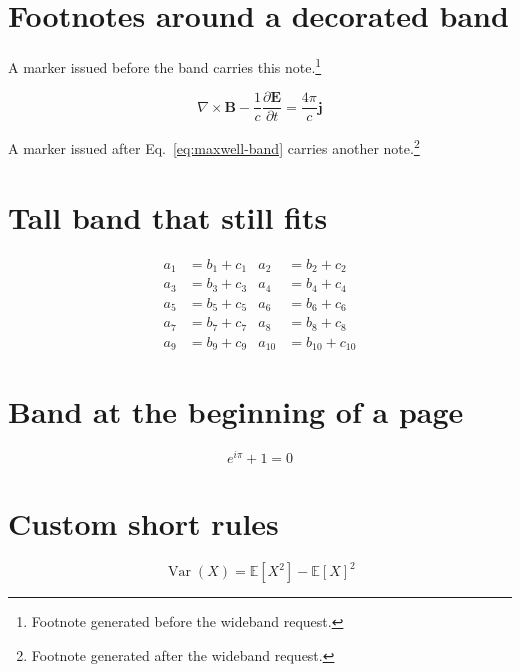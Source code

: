 \documentclass[twocolumn]{article}
\begin{document}
\section{Footnotes around a decorated band}
\WBTextA
A marker issued before the band carries this note.\footnote{Footnote generated before the wideband request.}
\begin{wideband}
\begin{equation}\label{eq:maxwell-band}
 \nabla\times\mathbf B-\frac{1}{c}\frac{\partial\mathbf E}{\partial t}
 =\frac{4\pi}{c}\mathbf j
\end{equation}
\end{wideband}
A marker issued after Eq.~\ref{eq:maxwell-band} carries another note.\footnote{Footnote generated after the wideband request.}
\WBTextC\WBTextE

\clearpage
\section{Tall band that still fits}
\WBTextB
\begin{wideband}
\begin{align}
 a_1&=b_1+c_1 & a_2&=b_2+c_2\\
 a_3&=b_3+c_3 & a_4&=b_4+c_4\\
 a_5&=b_5+c_5 & a_6&=b_6+c_6\\
 a_7&=b_7+c_7 & a_8&=b_8+c_8\\
 a_9&=b_9+c_9 & a_{10}&=b_{10}+c_{10}
\end{align}
\end{wideband}
\WBTextD\WBTextF

\clearpage
\section{Band at the beginning of a page}
\begin{wideband}
\begin{equation}e^{i\pi}+1=0\end{equation}
\end{wideband}
\WBTextA\WBTextB\WBTextC\WBTextD

\clearpage
\section{Custom short rules}
\setwidebandrulesep{4pt}
\WBTextG
\begin{wideband}
\begin{equation}
  \operatorname{Var}(X)=\mathbb E[X^2]-\mathbb E[X]^2
\end{equation}
\end{wideband}
\WBTextH\WBTextE\WBTextF
\end{document}
